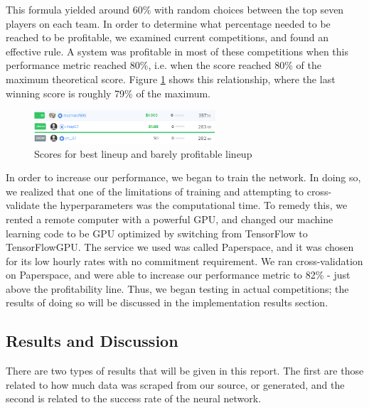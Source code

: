 This formula yielded around 60\% with random choices between the top seven players on each team. In order to determine what percentage needed to be reached to be profitable, we examined current competitions, and found an effective rule. A system was profitable in most of these competitions when this performance metric reached 80\%, i.e. when the score reached 80\% of the maximum theoretical score. Figure \ref{fig:80pRule} shows this relationship, where the last winning score is roughly 79\% of the maximum.
\begin{figure}[ht]
    \centering
    \includegraphics[width=0.6\textwidth]{figures/winningvslosing}
    \caption{Scores for best lineup and barely profitable lineup}
    \label{fig:80pRule}
\end{figure}
In order to increase our performance, we began to train the network. In doing so, we realized that one of the limitations of training and attempting to cross-validate the hyperparameters was the computational time. To remedy this, we rented a remote computer with a powerful GPU, %
 and changed our machine learning code to be GPU optimized by switching from TensorFlow to TensorFlowGPU. %
The service we used was called Paperspace, and it was chosen for its low hourly rates with no commitment requirement. We ran cross-validation on Paperspace, and were able to increase our performance metric to 82\% - just above the profitability line. Thus, we began testing in actual competitions; the results of doing so will be discussed in the implementation results section.

\subsection{Results and Discussion}
There are two types of results that will be given in this report. The first are those related to how much data was scraped from our source, or generated, and the second is related to the success rate of the neural network.

